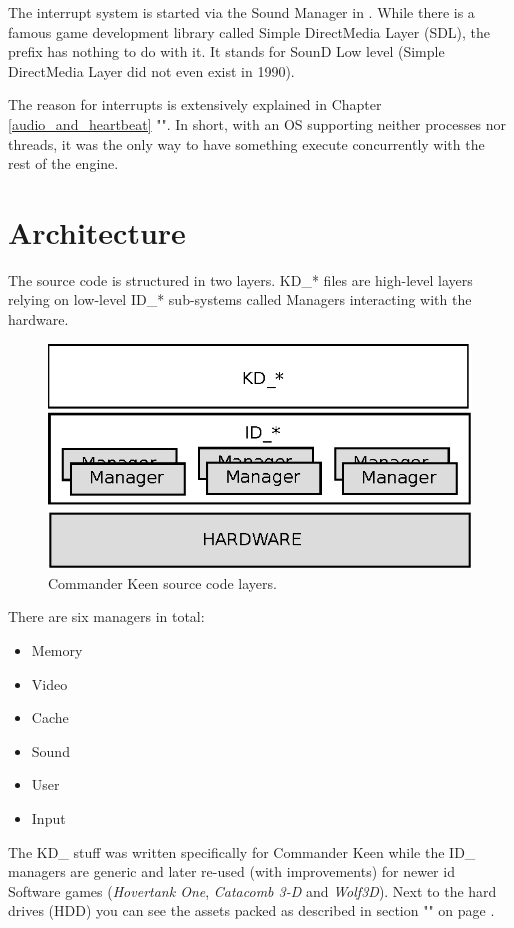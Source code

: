 \documentclass[book.tex]{subfiles}
\begin{document}
The interrupt system is started via the Sound Manager in . While there is a famous game development library called Simple DirectMedia Layer (SDL), the prefix  has nothing to do with it. It stands for SounD Low level (Simple DirectMedia Layer did not even exist in 1990).\\
\par
The reason for interrupts is extensively explained in Chapter \ref{audio_and_heartbeat} "". In short, with an OS supporting neither processes nor threads, it was the only way to have something execute concurrently with the rest of the engine.\\




\pagebreak
\section{Architecture}

The source code is structured in two layers. KD\_* files are high-level layers relying on low-level ID\_* sub-systems called Managers interacting with the hardware.\\
\par
\begin{figure}[H]
\centering
\includegraphics[width=\textwidth]{imgs/drawings/layers.eps} 
\caption{Commander Keen source code layers.}
 \end{figure}
 \par
There are six managers in total:\\

\begin{itemize}
	\item Memory
	\item Video
	\item Cache
	\item Sound
	\item User
	\item Input
\end{itemize}
\par
The KD\_ stuff was written specifically for Commander Keen while the ID\_ managers are generic and later re-used (with improvements) for newer id Software games (\textit{Hovertank One}, \textit{Catacomb 3-D} and \textit{Wolf3D}). Next to the hard drives (HDD) you can see the assets packed as described in section "" on page \pageref{section:graphic_assets}.
\end{document}
